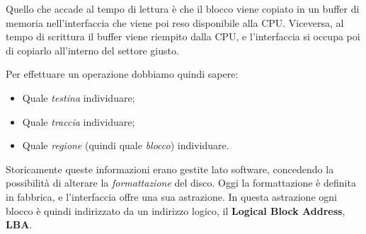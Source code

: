 \documentclass[a4paper,11pt]{article}
\begin{document}
Quello che accade al tempo di lettura è che il blocco viene copiato in un buffer di memoria nell'interfaccia che viene poi reso disponibile alla CPU.
Viceversa, al tempo di scrittura il buffer viene riempito dalla CPU, e l'interfaccia si occupa poi di copiarlo all'interno del settore giusto.

Per effettuare un operazione dobbiamo quindi sapere:
\begin{itemize}
	\item Quale \textit{testina} individuare;
	\item Quale \textit{traccia} individuare;
	\item Quale \textit{regione} (quindi quale \textit{blocco}) individuare.
\end{itemize}
Storicamente queste informazioni erano gestite lato software, concedendo la possibilità di alterare la \textit{formattazione} del disco.
Oggi la formattazione è definita in fabbrica, e l'interfaccia offre una sua astrazione.
In questa astrazione ogni blocco è quindi indirizzato da un indirizzo logico, il \textbf{Logical Block Address}, \textbf{LBA}.
\end{document}
